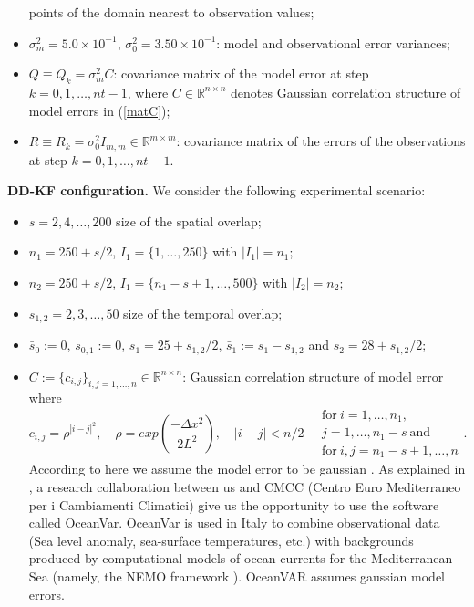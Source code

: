 \documentclass[smallcondensed]{svjour3}
\begin{document}
\begin{itemize}
points of the domain nearest to  observation values;
\item $\sigma_{m}^{2}=5.0\times 10^{-1} $, $\sigma_{0}^{2}= 3.50\times 10^{-1}$: model and  observational error variances;
\item $Q\equiv Q_{k}=\sigma_{m}^{2} C$: covariance matrix of the model error at  step $k=0,1,\ldots,nt-1$, where $C\in \mathbb{R}^{n\times n}$ denotes  Gaussian correlation structure of  model errors in (\ref{matC});
\item $R\equiv R_{k}=\sigma_{0}^{2} I_{m,m}\in \mathbb{R}^{m\times m}$: covariance matrix of the errors of the observations at step $k=0,1,\ldots,nt-1$.
\end{itemize}



\noindent  \textbf{DD-KF configuration.} We consider the following experimental scenario:
\begin{itemize}
\item $s=2,4,\ldots,200$  size of the spatial overlap;
\item $n_{1}=250+s/2$, $I_{1}=\{1,\ldots,250\}$ with $|I_{1}|=n_{1}$;
\item $n_{2}=250+s/2$, $I_{1}=\{n_{1}-s+1,\ldots,500\}$ with $|I_{2}|=n_{2}$;
\item ${s}_{1,2}=2,3,\ldots,50$  size of the temporal overlap;
\item $\bar{s}_{0}:=0$, ${s}_{0,1}:=0$, $s_{1}=25+s_{1,2}/2$, $\bar{s}_{1}:=s_{1}-{s}_{1,2}$ and $s_{2}=28+s_{1,2}/2$;
\item $C:=\{c_{i,j}\}_{i,j=1,\ldots,n}\in \mathbb{R}^{n\times n}$: Gaussian correlation structure of  model error where
 \begin{equation}\label{matC}
c_{i,j}=\rho^{|i-j|^{2}}, \quad \rho=exp\left(\frac{-\Delta x^{2}
}{2L^{2}}\right), \quad |i-j|<n/2 \quad  \begin{array}{ll}\textrm{for}\ i=1,\ldots,n_{1},\\
j=1,\ldots,n_{1}-s \ \textrm{and}\\ \textrm{for} \ i,j=n_{1}-s+1,\ldots,n\end{array}.
\end{equation}
 According to \cite{JSC} here we assume  the model error to be gaussian . As explained in \cite{JSC},  a research collaboration between us and CMCC (Centro Euro Mediterraneo per i Cambiamenti
Climatici) give us the opportunity to use the software called OceanVar.
OceanVar is used in
Italy to combine observational data (Sea level anomaly, sea-surface temperatures, etc.) with
backgrounds produced by computational models of ocean currents for the Mediterranean Sea
(namely, the NEMO framework \cite{NEMO}). OceanVAR assumes gaussian model errors.
\end{itemize}
\end{document}
